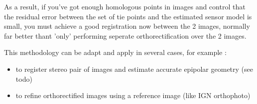 As a result, if you've got enough homologous points in images and control that
the residual error between the set of tie points and the estimated sensor model
is small, you must achieve a good registration now between the 2 images, normally far better thant 'only' performing seperate orthorectification over the 2 images.

This methodology can be adapt and apply in several cases, for example :
\begin{itemize}

\item to register stereo pair of images and estimate accurate epipolar geometry (see todo)
\item to refine orthorectified images using a reference image (like IGN orthophoto) 

\end{itemize}
